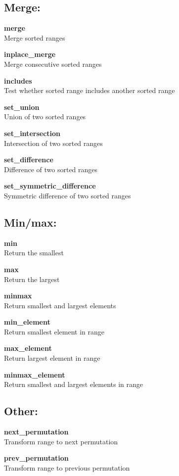 \documentclass[table]{article}
\begin{document}
\begin{multicols}{2}
	\subsection*{Merge:}
	
	\textbf{merge}\\
	Merge sorted ranges
	
	\textbf{inplace\_merge}\\
	Merge consecutive sorted ranges
	
	\textbf{includes}\\
	Test whether sorted range includes another sorted range
	
	\textbf{set\_union}\\
	Union of two sorted ranges
	
	\textbf{set\_intersection}\\
	Intersection of two sorted ranges
	
	\textbf{set\_difference}\\
	Difference of two sorted ranges
	
	\textbf{set\_symmetric\_difference}\\
	Symmetric difference of two sorted ranges
	
	\subsection*{Min/max:}
	
	\textbf{min}\\
	Return the smallest
	
	\textbf{max}\\
	Return the largest
	
	\textbf{minmax}\\
	Return smallest and largest elements
	
	\textbf{min\_element}\\
	Return smallest element in range
	
	\textbf{max\_element}\\
	Return largest element in range
	
	\textbf{minmax\_element}\\
	Return smallest and largest elements in range
	
	\subsection*{Other:}
	
	\textbf{next\_permutation}\\
	Transform range to next permutation
	
	\textbf{prev\_permutation}\\
	Transform range to previous permutation
	
	\end{multicols}
	\pagebreak

	\normalsize
\end{document}
